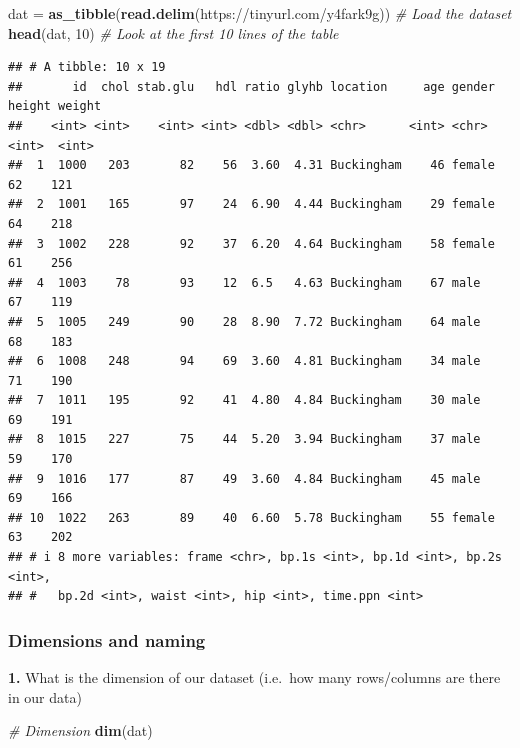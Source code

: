 \documentclass[
]{book}
\newenvironment{Shaded}{\begin{snugshade}}{\end{snugshade}}
\newcommand{\CommentTok}[1]{\textcolor[rgb]{0.56,0.35,0.01}{\textit{#1}}}
\newcommand{\DecValTok}[1]{\textcolor[rgb]{0.00,0.00,0.81}{#1}}
\newcommand{\FunctionTok}[1]{\textcolor[rgb]{0.13,0.29,0.53}{\textbf{#1}}}
\newcommand{\NormalTok}[1]{#1}
\newcommand{\OtherTok}[1]{\textcolor[rgb]{0.56,0.35,0.01}{#1}}
\newcommand{\StringTok}[1]{\textcolor[rgb]{0.31,0.60,0.02}{#1}}
\begin{document}
\begin{Shaded}
\begin{Highlighting}[]
\NormalTok{dat }\OtherTok{=} \FunctionTok{as\_tibble}\NormalTok{(}\FunctionTok{read.delim}\NormalTok{(}\StringTok{\textquotesingle{}https://tinyurl.com/y4fark9g\textquotesingle{}}\NormalTok{)) }\CommentTok{\# Load the dataset}
\FunctionTok{head}\NormalTok{(dat, }\DecValTok{10}\NormalTok{) }\CommentTok{\# Look at the first 10 lines of the table}
\end{Highlighting}
\end{Shaded}

\begin{verbatim}
## # A tibble: 10 x 19
##       id  chol stab.glu   hdl ratio glyhb location     age gender height weight
##    <int> <int>    <int> <int> <dbl> <dbl> <chr>      <int> <chr>   <int>  <int>
##  1  1000   203       82    56  3.60  4.31 Buckingham    46 female     62    121
##  2  1001   165       97    24  6.90  4.44 Buckingham    29 female     64    218
##  3  1002   228       92    37  6.20  4.64 Buckingham    58 female     61    256
##  4  1003    78       93    12  6.5   4.63 Buckingham    67 male       67    119
##  5  1005   249       90    28  8.90  7.72 Buckingham    64 male       68    183
##  6  1008   248       94    69  3.60  4.81 Buckingham    34 male       71    190
##  7  1011   195       92    41  4.80  4.84 Buckingham    30 male       69    191
##  8  1015   227       75    44  5.20  3.94 Buckingham    37 male       59    170
##  9  1016   177       87    49  3.60  4.84 Buckingham    45 male       69    166
## 10  1022   263       89    40  6.60  5.78 Buckingham    55 female     63    202
## # i 8 more variables: frame <chr>, bp.1s <int>, bp.1d <int>, bp.2s <int>,
## #   bp.2d <int>, waist <int>, hip <int>, time.ppn <int>
\end{verbatim}

\hypertarget{dimensions-and-naming}{%
\subsubsection{Dimensions and naming}\label{dimensions-and-naming}}

\textbf{1.} What is the dimension of our dataset (i.e.~how many rows/columns are there in our data)

\begin{Shaded}
\begin{Highlighting}[]
\CommentTok{\# Dimension}
\FunctionTok{dim}\NormalTok{(dat)}
\end{Highlighting}
\end{Shaded}
\end{document}
